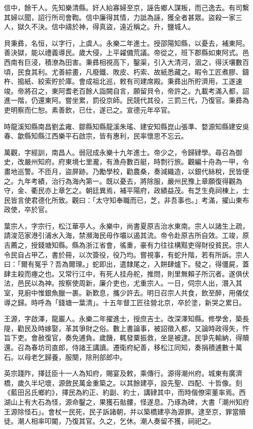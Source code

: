 \begin{pinyinscope}
信中，餘干人。先知樂清縣。奸人紿寡婦至京，誣告鄉人謀叛，而己逸去。有司繫其婦以聞，詔行所司會鞫。信中廉得其情，力詆為誣，獲全者甚眾。盜殺一家三人，獄久不決。信中禱於神，得真盜，遠近稱之。升，鹽城人。

貝秉彞，名恒，以字行，上虞人。永樂二年進士。授邵陽知縣，以憂去，補東阿。善決獄，能以禮義導民。歲大侵，上平糴備荒議。帝從之，班下郡縣如東阿式。邑西南有巨浸，積潦為田害。秉彞相視高下，鑿渠，引入大清河，涸之，得沃壤數百頃，民食其利。尤善綜畫，凡廢鐵、敗皮、朽索、故紙悉藏之。暇令工匠煮膠、鑄杵、搗紙、絞索貯於庫。會成祖北巡，敕有司建席殿。秉彞出所貯濟用，工遂速竣。帝將召之，東阿耆老百餘人詣闕自言，願留貝令，帝許之。九載考滿入都，詔進一階，仍還東阿。嘗坐累，罰役京師。民競代其役，三罰三代，乃復官。秉彞為吏明察而仁恕。素善飲，已仕，遂已之。宣德元年卒官。

時龍溪知縣南昌劉孟雍、鄒縣知縣龍溪朱瑤、建安知縣崑山張準、婺源知縣建安吳春、歙縣知縣江西樂平石啟宗，皆有惠利，民率懷思不忘云。

萬觀，字經訓，南昌人。弱冠成永樂十九年進士。帝少之，令歸肄學。尋召為御史，改嚴州知府。府東境七里瀧，有漁舟數百艇，時剽行旅。觀編十舟為一甲，令畫地巡警。不匝月，盜屏跡。乃勵學校，勸農桑，奏減織造，以銀代絲稅，民皆便之。九年考績，治行為海內第一。既以憂去，將除服，嚴州民豫上章願復得觀為守，金、衢民亦上章乞之。朝廷異焉，補平陽府，政績益茂。有芝生堯祠棟上，士民皆言使君德化所致。觀曰：「太守知奉職而已，芝，非吾事也。」考滿，擢山東布政使，卒於官。

葉宗人，字宗行，松江華亭人。永樂中，尚書夏原吉治水東南。宗人以諸生上疏，請浚范家港引浦水入海，禁瀕海民毋作壩以遏其流。帝令赴原吉所自效。工竣，原吉薦之，授錢塘知縣。縣為浙江省會，徭重，豪有力往往構黠吏得財役貧民。宗人令民自占甲乙，書於冊，以次簽役，役乃均。嘗視事，有蛇升階，若有所訴。宗人曰：「爾有冤乎？吾為爾理。」蛇即出，遣隸尾之，入餅肆爐下。發之，得僵屍，蓋肆主殺而瘞之也。又常行江中，有死人挂舟舵，推問，則里無賴子所沉者。遂俱伏法，邑民以為神。按察使周新，廉介吏也，尤重宗人。一日，伺宗人出，潛入其室，見廚中惟銀魚臘一裹。新歎息，攜少許去。明日召宗人共食，飲至醉，用儀仗導之歸。時呼為「錢塘一葉清」。十五年督工匠往營北京，卒於塗，新哭之累日。

王源，字啟澤，龍巖人。永樂二年擢進士，授庶吉士。改深澤知縣。修學舍，築長隄，勸民及時嫁娶，革其爭財之俗。數上書論事，被詔徵入都，又論時政得失，忤旨下吏。會赦復官，奏免逋負。歲饑，輒發粟振救，坐是被逮。民爭先輸納，得贖還。召為春坊司直郎，侍諸王講讀。遷衛府紀善，移松江同知，奏捐積逋數十萬石。以母老乞歸養，服闋，除刑部郎中。

英宗踐阼，擇廷臣十一人為知府，賜宴及敕，乘傳行。源得潮州府。城東有廣濟橋，歲久半圮壞，源斂民萬金重築之。以其餘建亭，設先聖、四配、十哲像。刻《藍田呂氏鄉約》，擇民為約正、約副、約士，講肄其中，而時偕僚寀董率焉。西湖山上有大石為怪，源命鑿之，果獲石骷髏，怪遂息。乃琢為碑，大書「潮州知府王源除怪石」。會杖一民死，民子訴諸朝，并以築橋建亭為源罪。逮至京，罪當贖徒。潮人相率叩閽，乃復其官。久之，乞休。潮人奏留不獲，祠祀之。


\end{pinyinscope}
